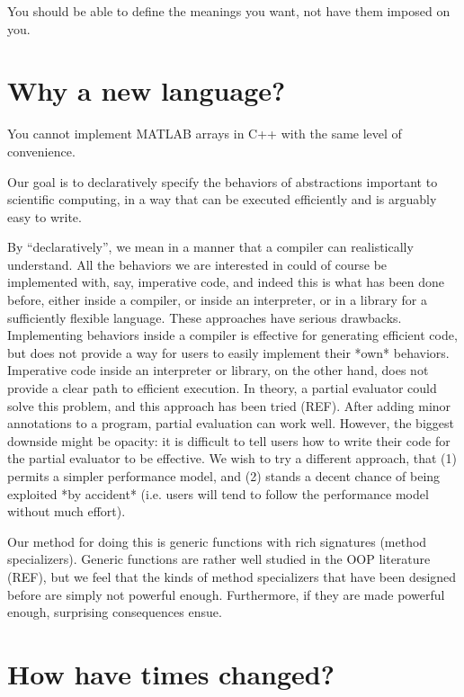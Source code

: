 You should be able to define the meanings you want, not have them
imposed on you.


\section{Why a new language?}

You cannot implement MATLAB arrays in C++ with the same level of
convenience.


Our goal is to declaratively specify the behaviors of abstractions
important to scientific computing, in a way that can be executed
efficiently and is arguably easy to write.

By ``declaratively'', we mean in a manner that a compiler can
realistically understand. All the behaviors we are interested in
could of course be implemented with, say, imperative code, and indeed
this is what has been done before, either inside a compiler, or inside
an interpreter, or in a library for a sufficiently flexible language.
These approaches have serious drawbacks. Implementing behaviors
inside a compiler is effective for generating efficient code, but
does not provide a way for users to easily implement their *own*
behaviors. Imperative code inside an interpreter or library, on the other hand,
does not provide a clear path to efficient execution. In theory, a
partial evaluator could solve this problem, and this approach has been
tried (REF). After adding minor annotations to a program, partial evaluation
can work well. However, the biggest downside might be opacity: it is
difficult to tell users how to write their code for the partial
evaluator to be effective. We wish to try a different approach, that
(1) permits a simpler performance model, and (2) stands a decent chance
of being exploited *by accident* (i.e. users will tend to follow the performance
model without much effort).


Our method for doing this is generic functions with rich signatures
(method specializers). Generic functions are rather well studied in the
OOP literature (REF), but we feel that the kinds of method specializers
that have been designed before are simply not powerful enough.
Furthermore, if they are made powerful enough, surprising consequences
ensue.



\section{How have times changed?}

